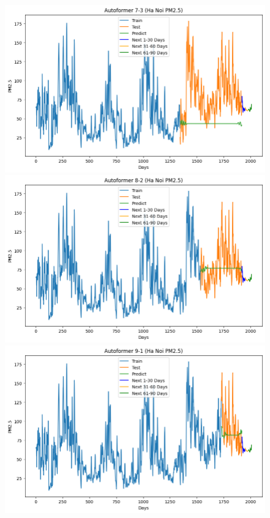 \begin{figure}[H]
{\begin{adjustbox}{minipage=0.48\textwidth}
\begin{minipage}{0.3\textwidth}
            \end{minipage}\hfill
            \begin{minipage}{0.3\textwidth}
                \centering
                \includegraphics[width=\textwidth]{img/final/Autoformer/90D/Autoformer_7_3_HN.png}\\
                \includegraphics[width=\textwidth]{img/final/Autoformer/90D/Autoformer_8_2_HN.png}\\
                \includegraphics[width=\textwidth,height=0.6\textwidth]{img/final/Autoformer/90D/Autoformer_9_1_HN.png}

\end{minipage}
\end{adjustbox}}
\end{figure}
